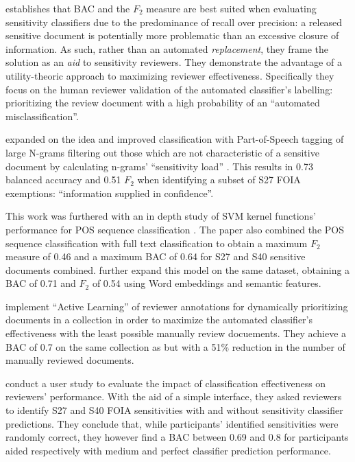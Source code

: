 \documentclass[\version]{l4proj}
\begin{document}
\textcite{berardiSemiAutomatedTextClassification2015} establishes that BAC and the \(F_{2}\) measure are best suited when evaluating sensitivity classifiers due to the predominance of recall over precision: a released sensitive document is potentially more problematic than an excessive closure of information.
As such, rather than an automated \textit{replacement}, they frame the solution as an \textit{aid} to sensitivity reviewers.
They demonstrate the advantage of a utility-theoric approach to maximizing reviewer effectiveness.
Specifically they focus on the human reviewer validation of the automated classifier's labelling: prioritizing the review document with a high probability of an ``automated misclassification''.

\textcite{mcdonaldUsingPartofSpeechNgrams2015} expanded on the idea and improved classification with Part-of-Speech tagging of large N-grams filtering out those which are not characteristic of a sensitive document by calculating n-grams' ``sensitivity load'' \autocite[2]{mcdonaldUsingPartofSpeechNgrams2015}.
This results in 0.73 balanced accuracy and 0.51 \(F_{2}\) when identifying a subset of S27 FOIA exemptions: ``information supplied in confidence''.

This work was furthered with an in depth study of SVM kernel functions' performance for POS sequence classification \autocite{mcdonaldStudySVMKernel2017}.
The paper also combined the POS sequence classification with full text classification to obtain a maximum \(F_{2}\) measure of 0.46 and a maximum BAC of 0.64 for S27 and S40 sensitive documents combined.
\autocite{mcdonaldEnhancingSensitivityClassification2017} further expand this model on the same dataset, obtaining a BAC of 0.71 and \(F_{2}\) of 0.54 using Word embeddings and semantic features.

\textcite{mcdonaldActiveLearningStrategies2018} implement ``Active Learning'' of reviewer annotations for dynamically prioritizing documents in a collection in order to maximize the automated classifier's effectiveness with the least possible manually review docuements.
They achieve a BAC of 0.7 on the same collection as \textcite{mcdonaldStudySVMKernel2017,mcdonaldEnhancingSensitivityClassification2017} but with a 51\% reduction in the number of manually reviewed documents.

\textcite{mcdonaldHowSensitivityClassification2019} conduct a user study to evaluate the impact of classification effectiveness on reviewers' performance. With the aid of a simple interface, they asked reviewers to identify S27 and S40 FOIA sensitivities with and without sensitivity classifier predictions.
They conclude that, while participants' identified sensitivities were randomly correct, they however find a BAC between 0.69 and 0.8 for participants aided respectively with medium and perfect classifier prediction performance.
\end{document}
